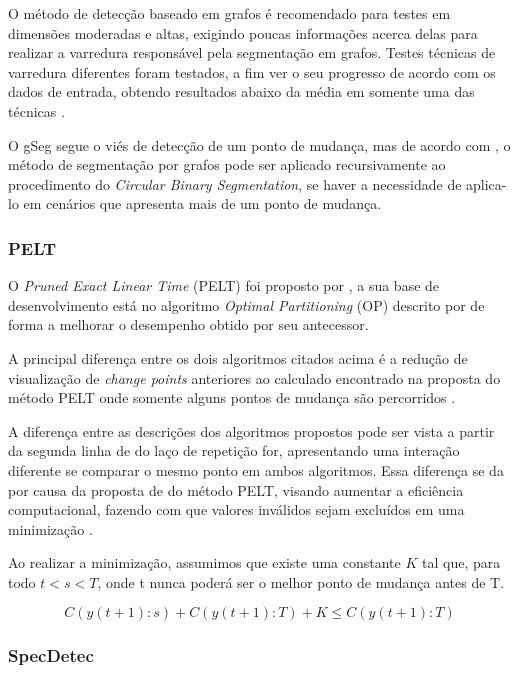 O método de detecção baseado em grafos é recomendado para testes em dimensões moderadas e altas, exigindo poucas informações acerca delas para realizar a varredura responsável pela segmentação em grafos. Testes técnicas de varredura diferentes foram testados, a fim ver o seu progresso de acordo com os dados de entrada, obtendo resultados abaixo da média em somente uma das técnicas \cite{Chen2015}. 

O gSeg segue o viés de detecção de um ponto de mudança, mas de acordo com \cite{Chen2015}, o método de segmentação por grafos pode ser aplicado recursivamente ao procedimento do \textit{Circular Binary Segmentation}, se haver a necessidade de aplica-lo em cenários que apresenta mais de um ponto de mudança.


\subsubsection{PELT}

O \textit{Pruned Exact Linear Time} (PELT) foi proposto por \cite{Killick2012}, a sua base de desenvolvimento está no algoritmo \textit{Optimal Partitioning} (OP) descrito por \cite{Gioumousis2005} de forma a melhorar o desempenho obtido por seu antecessor.

A principal diferença entre os dois algoritmos citados acima é a redução de visualização de \textit{change points} anteriores ao calculado encontrado na proposta do método PELT onde somente alguns pontos de mudança são percorridos \cite{BenedicteBakka2018}.

A diferença entre as descrições dos algoritmos propostos pode ser vista a partir da segunda linha de do laço de repetição for, apresentando uma interação diferente se comparar o mesmo ponto em ambos algoritmos. Essa diferença se da por causa da proposta de do método PELT, visando aumentar a eficiência computacional, fazendo com que valores inválidos sejam excluídos em uma minimização \cite{Killick2012}. 

Ao realizar a minimização, assumimos que existe uma constante $K$ tal que, para todo $t < s < T$, onde t nunca poderá ser o melhor ponto de mudança antes de T. 

\begin{equation}
    C\left ( y\left ( t+1 \right ):s \right ) + C\left ( y\left ( t+1 \right ):T \right ) + K \leq C\left ( y\left ( t+1 \right ):T \right )
    \label{eq:calculo-pelt}
\end{equation}


\subsubsection{SpecDetec}

